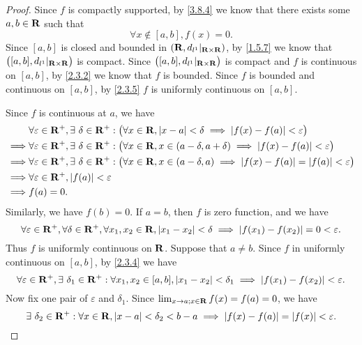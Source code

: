 \begin{proof}
  Since \(f\) is compactly supported, by \cref{3.8.4} we know that there exists some \(a, b \in \mathbf{R}\) such that
  \[
    \forall x \notin [a, b], f(x) = 0.
  \]
  Since \([a, b]\) is closed and bounded in \((\mathbf{R}, d_{l^1}|_{\mathbf{R} \times \mathbf{R}})\), by \cref{1.5.7} we know that \(\big([a, b], d_{l^1}|_{\mathbf{R} \times \mathbf{R}}\big)\) is compact.
  Since \(\big([a, b], d_{l^1}|_{\mathbf{R} \times \mathbf{R}}\big)\) is compact and \(f\) is continuous on \([a, b]\), by \cref{2.3.2} we know that \(f\) is bounded.
  Since \(f\) is bounded and continuous on \([a, b]\), by \cref{2.3.5} \(f\) is uniformly continuous on \([a, b]\).

  Since \(f\) is continuous at \(a\), we have
  \begin{align*}
             & \forall \varepsilon \in \mathbf{R}^+, \exists\ \delta \in \mathbf{R}^+ : \big(\forall x \in \mathbf{R}, \left\lvert x - a\right\rvert < \delta \implies \left\lvert f(x) - f(a)\right\rvert < \varepsilon\big)               \\
    \implies & \forall \varepsilon \in \mathbf{R}^+, \exists\ \delta \in \mathbf{R}^+ : \big(\forall x \in \mathbf{R}, x \in (a - \delta, a + \delta) \implies \left\lvert f(x) - f(a)\right\rvert < \varepsilon\big)     \\
    \implies & \forall \varepsilon \in \mathbf{R}^+, \exists\ \delta \in \mathbf{R}^+ : \big(\forall x \in \mathbf{R}, x \in (a - \delta, a) \implies \left\lvert f(x) - f(a)\right\rvert = \left\lvert f(a)\right\rvert < \varepsilon\big) \\
    \implies & \forall \varepsilon \in \mathbf{R}^+, \left\lvert f(a)\right\rvert < \varepsilon                                                                                                           \\
    \implies & f(a) = 0.
  \end{align*}
  Similarly, we have \(f(b) = 0\).
  If \(a = b\), then \(f\) is zero function, and we have
  \[
    \forall \varepsilon \in \mathbf{R}^+, \forall \delta \in \mathbf{R}^+, \forall x_1, x_2 \in \mathbf{R}, \left\lvert x_1 - x_2\right\rvert < \delta \implies \left\lvert f(x_1) - f(x_2)\right\rvert = 0 < \varepsilon.
  \]
  Thus \(f\) is uniformly continuous on \(\mathbf{R}\).
  Suppose that \(a \neq b\).
  Since \(f\) in uniformly continuous on \([a, b]\), by \cref{2.3.4} we have
  \[
    \forall \varepsilon \in \mathbf{R}^+, \exists\ \delta_1 \in \mathbf{R}^+ : \forall x_1, x_2 \in [a, b], \left\lvert x_1 - x_2\right\rvert < \delta_1 \implies \left\lvert f(x_1) - f(x_2)\right\rvert < \varepsilon.
  \]
  Now fix one pair of \(\varepsilon\) and \(\delta_1\).
  Since \(\lim_{x \to a ; x \in \mathbf{R}} f(x) = f(a) = 0\), we have
  \[
    \exists\ \delta_2 \in \mathbf{R}^+ : \forall x \in \mathbf{R}, \left\lvert x - a\right\rvert < \delta_2 < b - a \implies \left\lvert f(x) - f(a)\right\rvert = \left\lvert f(x)\right\rvert < \varepsilon.
  \]

\end{proof}
